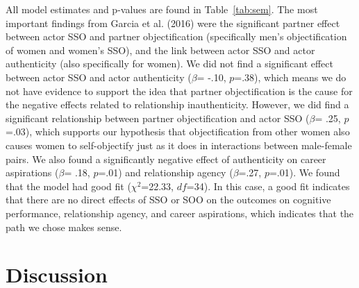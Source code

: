 \documentclass[man]{apa6}
\begin{document}
All model estimates and p-values are found in Table~\ref{tab:sem}. The
most important findings from Garcia et al. (2016) were the significant
partner effect between actor SSO and partner objectification
(specifically men's objectification of women and women's SSO), and the
link between actor SSO and actor authenticity (also specifically for
women). We did not find a significant effect between actor SSO and actor
authenticity (\(\beta\)= -.10, \(p\)=.38), which means we do not have
evidence to support the idea that partner objectification is the cause
for the negative effects related to relationship inauthenticity.
However, we did find a significant relationship between partner
objectification and actor SSO (\(\beta\)= .25, \(p\)=.03), which
supports our hypothesis that objectification from other women also
causes women to self-objectify just as it does in interactions between
male-female pairs. We also found a significantly negative effect of
authenticity on career aspirations (\(\beta\)= .18, \(p\)=.01) and
relationship agency (\(\beta\)=.27, \(p\)=.01). We found that the model
had good fit (\(\chi^2\)=22.33, \(df\)=34). In this case, a good fit
indicates that there are no direct effects of SSO or SOO on the outcomes
on cognitive performance, relationship agency, and career aspirations,
which indicates that the path we chose makes sense.

\section{Discussion}\label{discussion}
\end{document}
